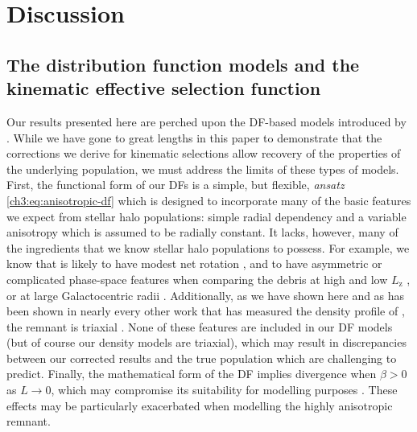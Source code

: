 \section{Discussion}
\label{ch3:sec:discussion}

\subsection{The distribution function models and the kinematic effective selection function}
\label{ch3:subsec:df-models-ksf-discussion}

Our results presented here are perched upon the DF-based models introduced by \cite{lane22}. While we have gone to great lengths in this paper to demonstrate that the corrections we derive for kinematic selections allow recovery of the properties of the underlying population, we must address the limits of these types of models. First, the functional form of our DFs is a simple, but flexible, \textit{ansatz} \eqref{ch3:eq:anisotropic-df} which is designed to incorporate many of the basic features we expect from stellar halo populations: simple radial dependency and a variable anisotropy which is assumed to be radially constant. It lacks, however, many of the ingredients that we know stellar halo populations to possess. For example, we know that \gse is likely to have modest net rotation \parencite{helmi18,lancaster19,iorio21}, and to have asymmetric or complicated phase-space features when comparing the debris at high and low $L_\mathrm{z}$ \parencite{helmi18,naidu20}, or at large Galactocentric radii \parencite{chandra23}. Additionally, as we have shown here and as has been shown in nearly every other work that has measured the density profile of \gse, the remnant is triaxial \parencite{iorio19,han22}. None of these features are included in our DF models (but of course our density models are triaxial), which may result in discrepancies between our corrected results and the true \gse population which are challenging to predict. Finally, the mathematical form of the DF implies divergence when $\beta > 0$ as $L \rightarrow 0$, which may compromise its suitability for modelling purposes \parencite[as discussed by ][]{binney14d}. These effects may be particularly exacerbated when modelling the highly anisotropic \gse remnant.

